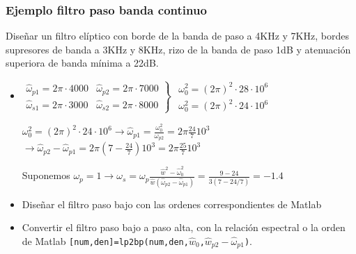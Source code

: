 

\begin{frame}
\frametitle{Ejemplo filtro paso banda continuo}

\vspace{-0.1cm}

\footnotesize

\color{olivegreen}Diseñar un filtro elíptico con borde de la banda de paso a 4KHz y 7KHz, bordes supresores de banda a 3KHz y 8KHz, rizo de la banda de paso 1dB y atenuación superiora de banda mínima a 22dB.

\vspace{-0.1cm}

\color{gray}
\begin{itemize}

\scriptsize
\item $\left . \begin{array}{ll}\hat \omega_{p1}=2\pi \cdot 4000 & \hat \omega_{p2}=2\pi \cdot 7000\\\hat \omega_{s1}=2\pi \cdot 3000 & \hat \omega_{s2}=2\pi \cdot 8000\end{array}\right \}$ $\begin{array}{l}\omega_0^2=(2\pi)^2 \cdot 28 \cdot 10^6\\ \omega_0^2=(2\pi)^2 \cdot 24 \cdot 10^6\end{array} $



$\omega_0^2\!=\!(2\pi)^2 \!\cdot \!24 \!\cdot 10^6 \rightarrow  \hat \omega_{p1}\!=\!\frac{\omega_0^2}{\omega_{p2}}\!=\!2\pi \frac{24}{7}10^3$ $\rightarrow \hat \omega_{p2}\!-\!\hat \omega_{p1}\!=\!2\pi(7\!-\!\frac{24}{7})10^3 \!=\!2\pi \frac{25}{7}10^3 $

\vspace{-0.1cm}

Suponemos $\omega_p=1 \rightarrow \omega_s=\omega_p\frac{\hat w^2-\hat \omega_0^2}{\hat w (\hat \omega_{p2}-\hat \omega_{p1})}=\frac{9-24}{3(7-24/7)}=-1.4$

 \footnotesize

\item Diseñar el filtro paso bajo con las ordenes correspondientes de Matlab

\item Convertir el filtro paso bajo a paso alta, con la relación espectral o la orden de Matlab  \alert{\texttt{[num,den]=lp2bp(num,den,$\hat{w}_0$,$\hat{w}_{p2}-\hat \omega_{p1}$)}}.

\end{itemize}


\end{frame}
